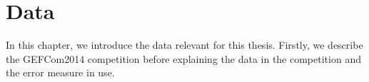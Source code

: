 \chapter{Data}
\label{ch:data}

In this chapter, we introduce the data relevant for this thesis. 
Firstly, we describe the GEFCom2014 competition before explaining  
the data in the competition and the error measure in use. 

